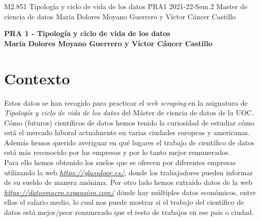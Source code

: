 \documentclass[IB]{PlantillaPACnova_Est}
\begin{document}
\textinicial
{M2.851} 				
{Tipología y ciclo de vida de los datos}
{PRA1}
{2021-22-Sem.2}
{Master de ciencia de datos}
{Maria Dolores Moyano Guerrero y Víctor Cáncer Castillo}




\begin{center}
\textbf{{\LARGE PRA 1 - Tipología y ciclo de vida de los datos}}\\[1cm]

\textbf{{\Large Maria Dolores Moyano Guerrero y Víctor Cáncer Castillo}}
\end{center}

\tableofcontents
\newpage 

\section{Contexto}

Estos datos se han recogido para practicar el \textit{web scraping} en la asignatura de \textit{Tipología y ciclo de vida de los datos} del Máster de ciencia de datos de la UOC.\\
Cómo (futuros) científicos de datos hemos tenido la curiosidad de estudiar cómo está el mercado laboral actualmente en varias ciudades europeas y americanas. Además hemos querido averiguar en qué lugares el trabajo de científico de datos está más reconocido por las empresas y por lo tanto mejor remunerados. \\
Para ello hemos obtenido los suelos que se ofrecen por diferentes empresas utilizando la web \textit{\url{https://glassdoor.es/}}, donde los trabajadores pueden informar de su sueldo de manera anónima. Por otro lado hemos extraído datos de la web \textit{ \url{https://datosmacro.expansion.com/}} dónde hay múltiples datos económicos, entre ellos el salario medio, lo cual nos puede mostrar si el trabajo del científico de datos está mejor/peor remunerado que el resto de trabajos en ese pais o ciudad. 
\\
\end{document}
